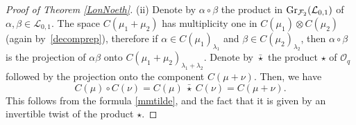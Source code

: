 \documentclass[pdftex]{sigma}
\numberwithin{equation}{section}
\theoremstyle{definition}
\newcommand{\Ll}{{\mathcal L}}
\newcommand{\Oo}{{\mathcal O}}
\begin{document}
\begin{proof}[Proof of Theorem \ref{LonNoeth}]
(ii) Denote by $\alpha \circ \beta$ the product in $ {\rm Gr}_{{\mathcal F}_2}({\mathcal L}_{0,1})$ of $\alpha,\beta\in \Ll_{0,1}$. The space $C(\mu_1+\mu_2)$ has multiplicity one in $C(\mu_1)\otimes C(\mu_2)$ (again by~\eqref{decomprep}), therefore if $\alpha \in C(\mu_1)_{\lambda_1}$ and $\beta \in C(\mu_2)_{\lambda_2}$, then $\alpha \circ \beta$ is the projection of $\alpha \beta$ onto $C(\mu_1+\mu_2)_{\lambda_1+\lambda_2}$.
 Denote by $\bar{\star}$ the product $\star$ of $\Oo_q$ followed by the projection onto the component $C(\mu + \nu)$. Then, we have
\begin{equation}\label{filtration=}
C(\mu) \circ C(\nu) = C(\mu)\ \bar{\star} \ C(\nu) = C(\mu + \nu).
\end{equation}
This follows from the formula \eqref{mmtilde}, and the fact that it is given by an invertible twist of the product $\star$.


\end{proof}
\end{document}
